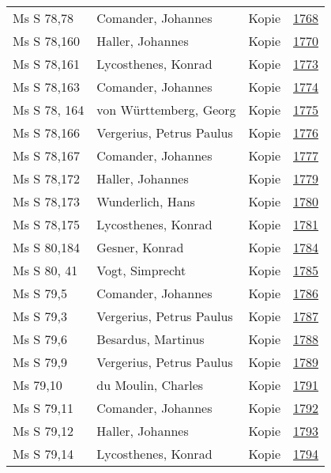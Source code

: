 \documentclass[10pt,a4paper,landscape]{report}
\begin{document}
\begin{longtable}{p{16cm}p{4cm}lr}
Ms S 78,78	&	Comander, Johannes	&	Kopie	&	\href{http://130.60.24.72/assignment/1768}{1768}\\
Ms S 78,160	&	Haller, Johannes	&	Kopie	&	\href{http://130.60.24.72/assignment/1770}{1770}\\
Ms S 78,161	&	Lycosthenes, Konrad	&	Kopie	&	\href{http://130.60.24.72/assignment/1773}{1773}\\
Ms S 78,163	&	Comander, Johannes	&	Kopie	&	\href{http://130.60.24.72/assignment/1774}{1774}\\
Ms S 78, 164	&	von Württemberg, Georg	&	Kopie	&	\href{http://130.60.24.72/assignment/1775}{1775}\\
Ms S 78,166	&	Vergerius, Petrus Paulus	&	Kopie	&	\href{http://130.60.24.72/assignment/1776}{1776}\\
Ms S 78,167	&	Comander, Johannes	&	Kopie	&	\href{http://130.60.24.72/assignment/1777}{1777}\\
Ms S 78,172	&	Haller, Johannes	&	Kopie	&	\href{http://130.60.24.72/assignment/1779}{1779}\\
Ms S 78,173	&	Wunderlich, Hans	&	Kopie	&	\href{http://130.60.24.72/assignment/1780}{1780}\\
Ms S 78,175	&	Lycosthenes, Konrad	&	Kopie	&	\href{http://130.60.24.72/assignment/1781}{1781}\\
Ms S 80,184	&	Gesner, Konrad	&	Kopie	&	\href{http://130.60.24.72/assignment/1784}{1784}\\
Ms S 80, 41	&	Vogt, Simprecht	&	Kopie	&	\href{http://130.60.24.72/assignment/1785}{1785}\\
Ms S 79,5	&	Comander, Johannes	&	Kopie	&	\href{http://130.60.24.72/assignment/1786}{1786}\\
Ms S 79,3	&	Vergerius, Petrus Paulus	&	Kopie	&	\href{http://130.60.24.72/assignment/1787}{1787}\\
Ms S 79,6	&	Besardus, Martinus	&	Kopie	&	\href{http://130.60.24.72/assignment/1788}{1788}\\
Ms S 79,9	&	Vergerius, Petrus Paulus	&	Kopie	&	\href{http://130.60.24.72/assignment/1789}{1789}\\
Ms 79,10	&	du Moulin, Charles	&	Kopie	&	\href{http://130.60.24.72/assignment/1791}{1791}\\
Ms S 79,11	&	Comander, Johannes	&	Kopie	&	\href{http://130.60.24.72/assignment/1792}{1792}\\
Ms S 79,12	&	Haller, Johannes	&	Kopie	&	\href{http://130.60.24.72/assignment/1793}{1793}\\
Ms S 79,14	&	Lycosthenes, Konrad	&	Kopie	&	\href{http://130.60.24.72/assignment/1794}{1794}\\

\end{longtable}
\end{document}
